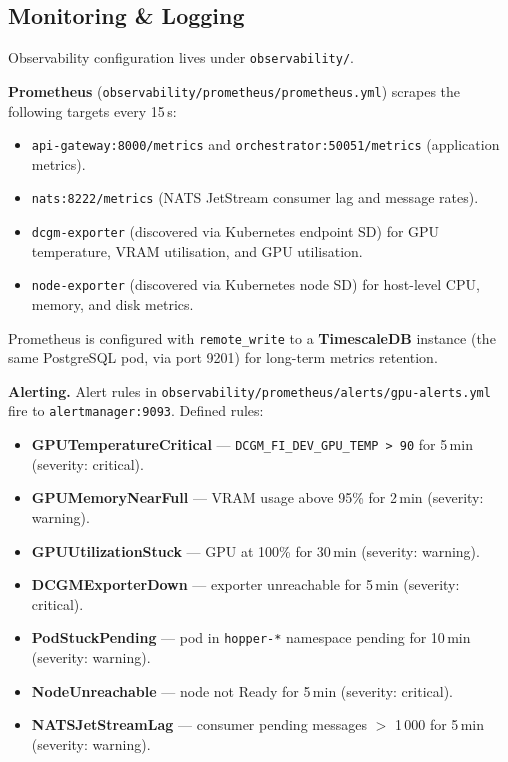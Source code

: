 \documentclass[12pt,a4paper]{article}
\begin{document}
\subsection{Monitoring \& Logging}

Observability configuration lives under \texttt{observability/}.

\medskip
\noindent\textbf{Prometheus} (\texttt{observability/prometheus/prometheus.yml})
scrapes the following targets every 15\,s:
\begin{itemize}[leftmargin=1.5em]
  \item \texttt{api-gateway:8000/metrics} and \texttt{orchestrator:50051/metrics}
        (application metrics).
  \item \texttt{nats:8222/metrics} (NATS JetStream consumer lag and message rates).
  \item \texttt{dcgm-exporter} (discovered via Kubernetes endpoint SD) for
        GPU temperature, VRAM utilisation, and GPU utilisation.
  \item \texttt{node-exporter} (discovered via Kubernetes node SD) for
        host-level CPU, memory, and disk metrics.
\end{itemize}

Prometheus is configured with \texttt{remote\_write} to a
\textbf{TimescaleDB} instance (the same PostgreSQL pod, via port 9201) for
long-term metrics retention.

\medskip
\noindent\textbf{Alerting.}
Alert rules in \texttt{observability/prometheus/alerts/gpu-alerts.yml}
fire to \texttt{alertmanager:9093}. Defined rules:

\begin{itemize}[leftmargin=1.5em]
  \item \textbf{GPUTemperatureCritical} --- \texttt{DCGM\_FI\_DEV\_GPU\_TEMP > 90}
        for 5\,min (severity: critical).
  \item \textbf{GPUMemoryNearFull} --- VRAM usage above 95\% for 2\,min
        (severity: warning).
  \item \textbf{GPUUtilizationStuck} --- GPU at 100\% for 30\,min
        (severity: warning).
  \item \textbf{DCGMExporterDown} --- exporter unreachable for 5\,min
        (severity: critical).
  \item \textbf{PodStuckPending} --- pod in \texttt{hopper-*} namespace
        pending for 10\,min (severity: warning).
  \item \textbf{NodeUnreachable} --- node not Ready for 5\,min
        (severity: critical).
  \item \textbf{NATSJetStreamLag} --- consumer pending messages
        $>$ 1\,000 for 5\,min (severity: warning).
\end{itemize}
\end{document}
